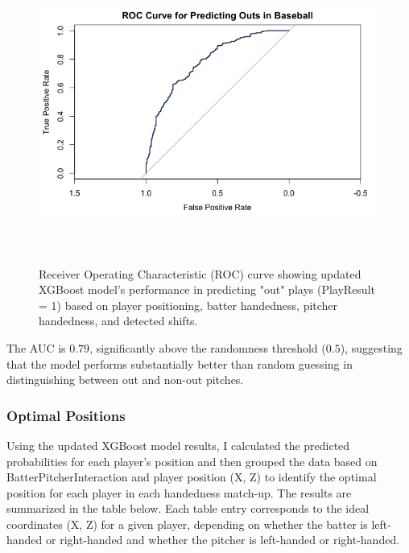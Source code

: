 \documentclass{article}
\begin{document}
\vspace{.4cm}
\begin{figure}[h]
    \centering
    \includegraphics[height=10cm]{images/roc_final.png}
    \caption{Receiver Operating Characteristic (ROC) curve showing updated XGBoost model's performance in predicting "out" plays (PlayResult = 1) based on player positioning, batter handedness, pitcher handedness, and detected shifts.}
\end{figure}
\vspace{.7cm}

The AUC is $0.79$, significantly above the randomness threshold ($0.5$), suggesting that the model performs substantially better than random guessing in distinguishing between out and non-out pitches. 

\subsubsection{Optimal Positions}
Using the updated XGBoost model results, I calculated the predicted probabilities for each player's position and then grouped the data based on BatterPitcherInteraction and player position (X, Z) to identify the optimal position for each player in each handedness match-up. The results are summarized in the table below. Each table entry corresponds to the ideal coordinates (X, Z) for a given player, depending on whether the batter is left-handed or right-handed and whether the pitcher is left-handed or right-handed.
\end{document}

